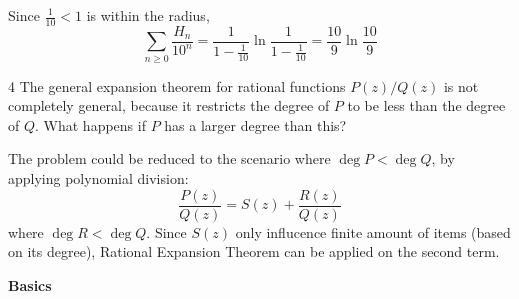 \documentclass[a4paper,12pt]{article}
\makeatletter
\newtheorem*{solution}{Solution}
\theoremstyle{definition}
\renewenvironment{solution}[1][Solution] {\par\pushQED{\qed}\normalfont\topsep6\p@\@plus6\p@\relax\trivlist\item[\hskip\labelsep\bfseries#1\@addpunct{.}]\ignorespaces}{\popQED\endtrivlist\@endpefalse} \makeatother
\newenvironment{problems}{\begin{list}{}{\renewcommand{\makelabel}[1]{\textbf{##1}\hfil}}}{\end{list}}
\makeatother
\begin{document}
\begin{problems}
\begin{solution}
       Since $\frac{1}{10}<1$ is within the radius,
       \begin{equation*}
           \sum_{n\geq 0} \frac{H_n}{10^n} = \frac{1}{1-\frac{1}{10}}\ln \frac{1}{1-\frac{1}{10}} = \frac{10}{9}\ln \frac{10}{9}
       \end{equation*}
   \end{solution}
   \item[4]  The general expansion theorem for rational functions $P(z)/Q(z)$ is not completely general,  because it restricts the degree of $P$ to be less than the degree of $Q$.  What happens if $P$ has a larger degree than this?
   \begin{solution}
       The problem could be reduced to the scenario where $\deg P < \deg Q$, by applying polynomial division:
       \begin{equation*}
           \frac{P(z)}{Q(z)} = S(z) + \frac{R(z)}{Q(z)}
       \end{equation*}
       where $\deg R< \deg Q$. Since $S(z)$ only influcence finite amount of items (based on its degree), Rational Expansion Theorem can be applied on the second term.
   \end{solution} 
\end{problems}

\noindent\textbf{Basics}
\end{document}
